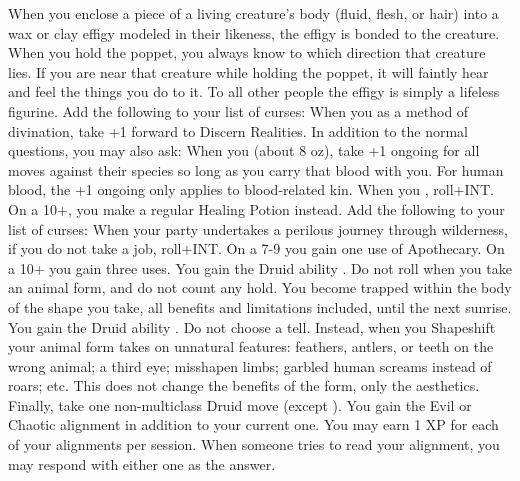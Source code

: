 \documentclass[darkmode]{dw_playbook}
\begin{document}
    {
            {When you enclose a piece of a living creature’s body (fluid, flesh, or hair) into a wax or clay effigy modeled in their likeness, the effigy is bonded to the creature.  When you hold the poppet, you always know to which direction that creature lies.  If you are near that creature while holding the poppet, it will faintly hear and feel the things you do to it.  To all other people the effigy is simply a lifeless figurine.}
        \gap
            {Add the following to your list of curses:
            \gapSm
            }
        \gap
            {When you  as a method of divination, take +1 forward to Discern Realities.  In addition to the normal questions, you may also ask:
            \gapSm
            }
        \gap
            {When you  (about 8 oz), take +1 ongoing for all moves against their species so long as you carry that blood with you.  For human blood, the +1 ongoing only applies to blood-related kin.}
        \gap
            {
            When you , roll+INT.  On a 10+, you make a regular Healing Potion instead.}
            {Add the following to your list of curses:
            \gapSm
            }
        \gap
            {When your party undertakes a perilous journey through wilderness, if you do not take a job, roll+INT.  On a 7-9 you gain one use of Apothecary.  On a 10+ you gain three uses.}
        \gap
            {You gain the Druid ability .  Do not roll when you take an animal form, and do not count any hold.  You become trapped within the body of the shape you take, all benefits and limitations included, until the next sunrise.
            \gap
            You gain the Druid ability .  Do not choose a tell.  Instead, when you Shapeshift your animal form takes on unnatural features: feathers, antlers, or teeth on the wrong animal; a third eye; misshapen limbs; garbled human screams instead of roars; etc.  This does not change the benefits of the form, only the aesthetics.
            \gap
            Finally, take one non-multiclass Druid move (except ).}
        \gap
            {You gain the Evil or Chaotic alignment in addition to your current one.  You may earn 1 XP for each of your alignments per session.  When someone tries to read your alignment, you may respond with either one as the answer.}
    }
\end{document}
